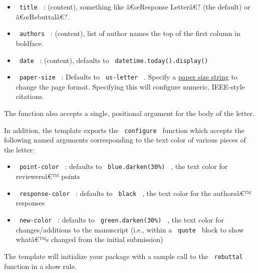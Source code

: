 \begin{itemize}
\tightlist
\item
  \texttt{\ title\ } : (content), something like â€œResponse Letterâ€?
  (the default) or â€œRebuttalâ€?.
\item
  \texttt{\ authors\ } : (content), list of author names the top of the
  first column in boldface.
\item
  \texttt{\ date\ } : (content), defaults to
  \texttt{\ datetime.today().display()\ }
\item
  \texttt{\ paper-size\ } : Defaults to \texttt{\ us-letter\ } . Specify
  a
  \href{https://typst.app/docs/reference/layout/page/\#parameters-paper}{paper
  size string} to change the page format. Specifying this will configure
  numeric, IEEE-style citations.
\end{itemize}

The function also accepts a single, positional argument for the body of
the letter.

In addition, the template exports the \texttt{\ configure\ } function
which accepts the following named arguments corresponding to the text
color of various pieces of the letter:

\begin{itemize}
\tightlist
\item
  \texttt{\ point-color\ } : defaults to \texttt{\ blue.darken(30\%)\ }
  , the text color for reviewersâ€™ points
\item
  \texttt{\ response-color\ } : defaults to \texttt{\ black\ } , the
  text color for the authorsâ€™ responses
\item
  \texttt{\ new-color\ } : defaults to \texttt{\ green.darken(30\%)\ } ,
  the text color for changes/additions to the manuscript (i.e., within a
  \texttt{\ quote\ } block to show whatâ€™s changed from the initial
  submission)
\end{itemize}

The template will initialize your package with a sample call to the
\texttt{\ rebuttal\ } function in a show rule.

\begin{Shaded}
\begin{Highlighting}[]
\NormalTok{)}

\NormalTok{)}

\end{Highlighting}
\end{Shaded}

